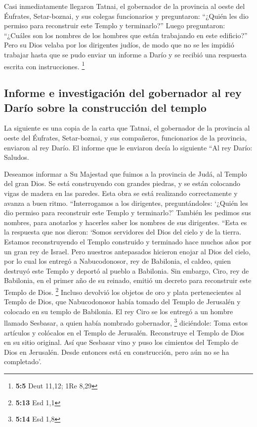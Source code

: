  Casi inmediatamente llegaron Tatnai, el gobernador de la
provincia al oeste del Éufrates, Setar-boznai, y sus colegas
funcionarios y preguntaron: ``¿Quién les dio permiso para reconstruir
este Templo y terminarlo?''  Luego preguntaron: ``¿Cuáles
son los nombres de los hombres que están trabajando en este edificio?''
 Pero su Dios velaba por los dirigentes judíos, de modo
que no se les impidió trabajar hasta que se pudo enviar un informe a
Darío y se recibió una respuesta escrita con instrucciones. \footnote{\textbf{5:5}
  Deut 11,12; 1Re 8,29}

\hypertarget{informe-e-investigaciuxf3n-del-gobernador-al-rey-daruxedo-sobre-la-construcciuxf3n-del-templo}{%
\subsection{Informe e investigación del gobernador al rey Darío sobre la
construcción del
templo}\label{informe-e-investigaciuxf3n-del-gobernador-al-rey-daruxedo-sobre-la-construcciuxf3n-del-templo}}

 La siguiente es una copia de la carta que Tatnai, el
gobernador de la provincia al oeste del Éufrates, Setar-boznai, y sus
compañeros, funcionarios de la provincia, enviaron al rey Darío.
 El informe que le enviaron decía lo siguiente ``Al rey
Darío: Saludos.

 Deseamos informar a Su Majestad que fuimos a la provincia
de Judá, al Templo del gran Dios. Se está construyendo con grandes
piedras, y se están colocando vigas de madera en las paredes. Esta obra
se está realizando correctamente y avanza a buen ritmo. 
``Interrogamos a los dirigentes, preguntándoles: `¿Quién les dio permiso
para reconstruir este Templo y terminarlo?'  También les
pedimos sus nombres, para anotarlos y hacerles saber los nombres de sus
dirigentes.  ``Esta es la respuesta que nos dieron:
`Somos servidores del Dios del cielo y de la tierra. Estamos
reconstruyendo el Templo construido y terminado hace muchos años por un
gran rey de Israel.  Pero nuestros antepasados hicieron
enojar al Dios del cielo, por lo cual los entregó a Nabucodonosor, rey
de Babilonia, el caldeo, quien destruyó este Templo y deportó al pueblo
a Babilonia.  Sin embargo, Ciro, rey de Babilonia, en el
primer año de su reinado, emitió un decreto para reconstruir este Templo
de Dios. \footnote{\textbf{5:13} Esd 1,1}  Incluso
devolvió los objetos de oro y plata pertenecientes al Templo de Dios,
que Nabucodonosor había tomado del Templo de Jerusalén y colocado en su
templo de Babilonia. El rey Ciro se los entregó a un hombre llamado
Sesbasar, a quien había nombrado gobernador, \footnote{\textbf{5:14} Esd
  1,8}  diciéndole: Toma estos artículos y colócalos en
el Templo de Jerusalén. Reconstruye el Templo de Dios en su sitio
original.  Así que Sesbasar vino y puso los cimientos del
Templo de Dios en Jerusalén. Desde entonces está en construcción, pero
aún no se ha completado'.

